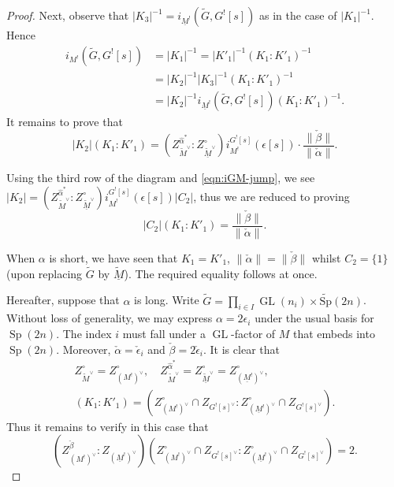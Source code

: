 \documentclass[11pt, a4paper, openany]{book}
\newenvironment{Proof of claim}
  {\renewcommand\qedsymbol{$\blacksquare$}\begin{proof}[Proof of claim]}
  {\end{proof}}
\newcommand{\GL}{\operatorname{GL}}
\newcommand{\Sp}{\operatorname{Sp}}
\newcommand{\Mp}{\ensuremath{\widetilde{\mathrm{Sp}}}}
\theoremstyle{remark}
\theoremstyle{remark}
\theoremstyle{remark}
\theoremstyle{remark}
\begin{document}
\begin{proof}
	Next, observe that $|K_3|^{-1} = i_{\underline{M}^!}(\tilde{G}, G^![s])$ as in the case of $|K_1|^{-1}$. Hence
	\begin{align*}
		i_{M^!}(\tilde{G}, G^![s]) & = |K_1|^{-1} = |K'_1|^{-1} (K_1 : K'_1)^{-1} \\
		& = |K_2|^{-1} |K_3|^{-1} (K_1 : K'_1)^{-1} \\
		& = |K_2|^{-1} i_{\underline{M}^!}(\tilde{G}, G^![s]) (K_1 : K'_1)^{-1}.
	\end{align*}
	It remains to prove that
	\begin{equation*}
		|K_2| (K_1 : K'_1) = \left( Z_{\tilde{M}^\vee}^{\hat{\alpha}^*} : Z_{\underline{\tilde{M}}^\vee}^\circ \right)  i^{G^![s]}_{M^!}(\epsilon[s]) \cdot \frac{\|\check{\beta}\|}{\|\check{\alpha}\|} .
	\end{equation*}

	Using the third row of the diagram and \eqref{eqn:iGM-jump}, we see $|K_2| = \left( Z_{\tilde{M}^\vee}^{\hat{\alpha}^*} : Z_{\underline{\tilde{M}}^\vee}^\circ \right)  i^{G^![s]}_{M^!}(\epsilon[s]) |C_2|$, thus we are reduced to proving
	\begin{equation*}
		|C_2| (K_1 : K'_1) = \frac{\|\check{\beta}\|}{\|\check{\alpha}\|}.
	\end{equation*}

	When $\alpha$ is short, we have seen that $K_1 = K'_1$, $\|\check{\alpha}\| = \|\check{\beta}\|$ whilst $C_2 = \{1\}$ (upon replacing $\tilde{G}$ by $\underline{\tilde{M}}$). The required equality follows at once.
	
	Hereafter, suppose that $\alpha$ is long. Write $\tilde{G} = \prod_{i \in I} \GL(n_i) \times \Mp(2n)$. Without loss of generality, we may express $\alpha = 2\epsilon_i$ under the usual basis for $\Sp(2n)$. The index $i$ must fall under a $\GL$-factor of $M$ that embeds into $\Sp(2n)$. Moreover, $\check{\alpha} = \check{\epsilon}_i$ and $\check{\beta} = 2\check{\epsilon}_i$. It is clear that
	\begin{gather*}
		Z_{\tilde{M}^\vee}^\circ = Z_{(M^!)^\vee}^\circ , \quad Z_{\tilde{M}^\vee}^{\hat{\alpha}^*} = Z_{\underline{\tilde{M}}^\vee}^\circ = Z_{(\underline{M}^!)^\vee}^\circ, \\
		(K_1 : K'_1 ) = \left( Z_{(M^!)^\vee}^\circ \cap Z_{G^![s]^\vee} : Z_{(\underline{M}^!)^\vee}^\circ \cap Z_{G^![s]^\vee} \right).
	\end{gather*}
	Thus it remains to verify in this case that
	\begin{equation}\label{eqn:jump-m-aux}
		\left( Z_{(M^!)^\vee}^{\check{\beta}} : Z_{(\underline{M}^!)^\vee} \right) \left( Z_{(M^!)^\vee}^\circ \cap Z_{G^![s]^\vee} : Z_{(\underline{M}^!)^\vee}^\circ \cap Z_{G^![s]^\vee} \right) = 2.
	\end{equation}


\end{proof}
\end{document}
